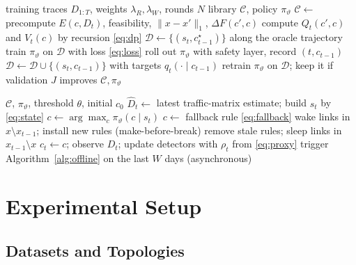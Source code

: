 \documentclass[conference]{IEEEtran}
\begin{document}
\begin{algorithm}[t]
\caption{LiRA offline training}
\label{alg:offline}
\footnotesize
\begin{algorithmic}[1]
\Require training traces $D_{1:T}$, weights $\lambda_R,\lambda_W$, rounds $N$
\Ensure library $\mathcal{C}$, policy $\pi_\vartheta$
\State $\mathcal{C}\gets$  
\State precompute $E(c,D_t)$, feasibility, $\|x-x'\|_1$, $\Delta F(c',c)$
\State compute $Q_t(c',c)$ and $V_t(c)$ by recursion \eqref{eq:dp}
\State $\mathcal{D}\gets\{(s_t,c^\star_{t-1})\}$ along the oracle trajectory
\State train $\pi_\vartheta$ on $\mathcal{D}$ with loss \eqref{eq:loss}
\State roll out $\pi_\vartheta$ with safety layer, record $(t,c_{t-1})$
\State $\mathcal{D}\gets\mathcal{D}\cup\{(s_t,c_{t-1})\}$ with targets $q_t(\cdot\mid c_{t-1})$
\State retrain $\pi_\vartheta$ on $\mathcal{D}$; keep it if validation $J$ improves
\EndFor
\State \Return $\mathcal{C},\pi_\vartheta$
\end{algorithmic}
\end{algorithm}

\begin{algorithm}[t]
\caption{LiRA online control loop}
\label{alg:online}
\footnotesize
\begin{algorithmic}[1]
\Require $\mathcal{C}$, $\pi_\vartheta$, threshold $\theta$, initial $c_0$
\State $\hat{D}_t\gets$ latest traffic-matrix estimate; build $s_t$ by \eqref{eq:state}
\State $c\gets\arg\max_{c}\pi_\vartheta(c\mid s_t)$
\State $c\gets$ fallback rule \eqref{eq:fallback}
\EndIf
{}
\State wake links in $x\setminus x_{t-1}$; install new rules (make-before-break)
\State remove stale rules; sleep links in $x_{t-1}\setminus x$
\EndIf
\State $c_t\gets c$; observe $D_t$; update detectors with $\rho_t$ from \eqref{eq:proxy}
\State trigger Algorithm~\ref{alg:offline} on the last $W$ days (asynchronous)
\EndIf
\EndFor
\end{algorithmic}
\end{algorithm}

\section{Experimental Setup}\label{sec:setup}

\subsection{Datasets and Topologies}
\end{document}
